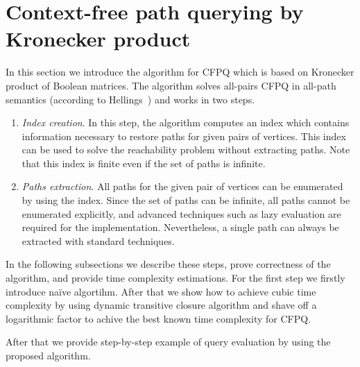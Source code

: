\section{Context-free path querying by Kronecker product}


In this section we introduce the algorithm for CFPQ which is based on Kronecker product of Boolean matrices.
The algorithm solves all-pairs CFPQ in all-path semantics (according to Hellings~\cite{hellingsPathQuerying}) and works in two steps.
\begin{enumerate}
\item \emph{Index creation}.
 In this step, the algorithm computes an index which contains information necessary to restore paths for given pairs of vertices.
 This index can be used to solve the reachability problem without extracting paths.
 Note that this index is finite even if the set of paths is infinite.
\item \emph{Paths extraction}.
All paths for the given pair of vertices can be enumerated by using the index.
Since the set of paths can be infinite, all paths cannot be enumerated explicitly, and advanced techniques such as lazy evaluation are required for the implementation.
Nevertheless, a single path can always be extracted with standard techniques.
\end{enumerate}

In the following subsections we describe these steps, prove correctness of the algorithm, and provide time complexity estimations.
For the first step we firstly introduce na{\"i}ve algortihm. After that we show how to achieve cubic time complexity by using dynamic transitive closure algorithm and shave off a logarithmic factor to achive the best known time complexity for CFPQ.

After that we provide step-by-step example of query evaluation by using the proposed algorithm.



